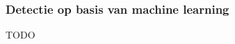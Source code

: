 \subsubsection{Detectie op basis van machine learning}
\label{subsubsec:machinelearning-detectie}

TODO